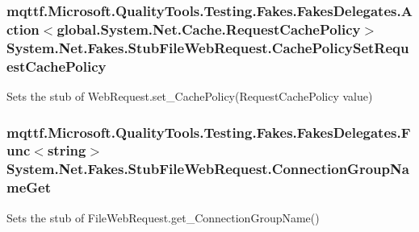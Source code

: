 \hypertarget{class_system_1_1_net_1_1_fakes_1_1_stub_file_web_request_a9b73ba9bd8b7349ae5c9b6f12e0d7a18}{
\subsubsection[{Cache\-Policy\-Set\-Request\-Cache\-Policy}]{\setlength{\rightskip}{0pt plus 5cm}mqttf.\-Microsoft.\-Quality\-Tools.\-Testing.\-Fakes.\-Fakes\-Delegates.\-Action$<$global.\-System.\-Net.\-Cache.\-Request\-Cache\-Policy$>$ System.\-Net.\-Fakes.\-Stub\-File\-Web\-Request.\-Cache\-Policy\-Set\-Request\-Cache\-Policy}}\label{class_system_1_1_net_1_1_fakes_1_1_stub_file_web_request_a9b73ba9bd8b7349ae5c9b6f12e0d7a18}


Sets the stub of Web\-Request.\-set\-\_\-\-Cache\-Policy(\-Request\-Cache\-Policy value)

\hypertarget{class_system_1_1_net_1_1_fakes_1_1_stub_file_web_request_ae9fa354178edc0be0100d808f5b677f1}{
\subsubsection[{Connection\-Group\-Name\-Get}]{\setlength{\rightskip}{0pt plus 5cm}mqttf.\-Microsoft.\-Quality\-Tools.\-Testing.\-Fakes.\-Fakes\-Delegates.\-Func$<$string$>$ System.\-Net.\-Fakes.\-Stub\-File\-Web\-Request.\-Connection\-Group\-Name\-Get}}\label{class_system_1_1_net_1_1_fakes_1_1_stub_file_web_request_ae9fa354178edc0be0100d808f5b677f1}


Sets the stub of File\-Web\-Request.\-get\-\_\-\-Connection\-Group\-Name()

